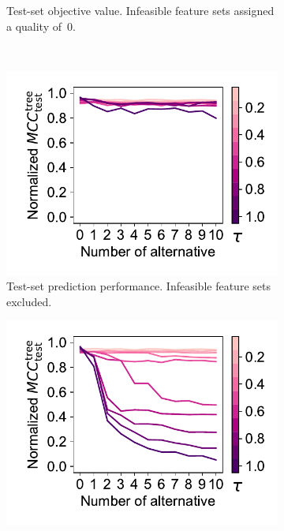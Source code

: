 \documentclass{article}
\theoremstyle{definition}
\begin{document}
\begin{figure}[p]
\begin{subfigure}[t]{0.48\textwidth}
		\caption{
			Test-set objective value.
			Infeasible feature sets assigned a quality of~0.
		}
		\label{fig:afs:impact-num-alternatives-tau-test-objective-max-fillna}
	\end{subfigure}
	\\ \vspace{\baselineskip}
	\begin{subfigure}[t]{0.48\textwidth}
		\centering
		\includegraphics[width=\textwidth, trim=15 17 10 15, clip]{plots/afs-impact-num-alternatives-tau-decision-tree-test-mcc-max.pdf}
		\caption{
			Test-set prediction performance.
			Infeasible feature sets excluded.
		}
		\label{fig:afs:impact-num-alternatives-tau-decision-tree-test-mcc-max}
	\end{subfigure}
	\hfill
	\begin{subfigure}[t]{0.48\textwidth}
		\centering
		\includegraphics[width=\textwidth, trim=15 17 10 15, clip]{plots/afs-impact-num-alternatives-tau-decision-tree-test-mcc-max-fillna.pdf}

\end{subfigure}
\end{figure}
\end{document}
